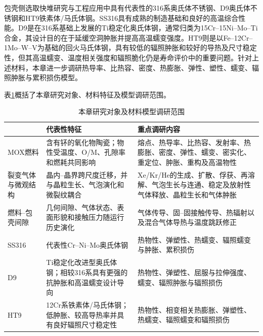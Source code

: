 包壳侧选取快堆研究与工程应用中具有代表性的316系奥氏体不锈钢、D9奥氏体不锈钢和HT9铁素体/马氏体钢。SS316具有成熟的制造基础和良好的高温综合性能。D9是在316系基础上发展的Ti稳定化奥氏体钢，通常归类为15Cr--15Ni--Mo--Ti合金，其设计目的在于延缓空洞肿胀并提高高温蠕变强度。HT9则是以Fe--12Cr--1Mo--W--V为基础的回火马氏体钢，具有较低的辐照肿胀和较好的导热及尺寸稳定性，但其高温蠕变、温度相关强度和辐照脆化仍是寿命评价中的重要问题\cite{garnerComparisonSwellingIrradiation2000,lathaThermalCreepProperties2008,leibowitzThermalConductivityThermal1988,chenIRRADIATIONEFFECTSHT92013}。针对上述材料，本章进一步调研热导率、比热容、密度、热膨胀、弹性、塑性、蠕变、辐照肿胀与累积损伤模型。

表\ref{tab:chapter2_model_scope}概括了本章研究对象、材料特征及模型调研范围。

\begin{table}[htbp]
	\centering
	\caption{本章研究对象及材料模型调研范围}
	\label{tab:chapter2_model_scope}
	\begin{tabularx}{\textwidth}{
			>{\raggedright\arraybackslash}p{2.35cm}
			>{\raggedright\arraybackslash}p{3.15cm}
			>{\raggedright\arraybackslash}X}
		\toprule
		{\centering 研究对象\par} & {\centering 代表性特征\par} & {\centering 重点调研内容\par} \\
		\midrule
		MOX燃料
		& 含有钚的氧化物陶瓷；物性受温度、O/M、孔隙率和燃耗共同影响
		& 熔点、热导率、比热容、发射率、热膨胀、密度、弹性、蠕变、密实化、重定位、肿胀、重构及高温物性 \\
		\addlinespace[0.5ex]
		裂变气体与微观结构
		& 晶内--晶界跨尺度迁移，并与晶粒生长、气泡演化和微裂纹耦合
		& Xe/Kr/He的生成、扩散、俘获、再溶解、气泡生长与连通、稳定及放射性气体释放、晶粒生长和气体肿胀 \\
		燃料--包壳间隙
		& 几何间隙、气体状态、表面形貌和接触压力随运行历史演化
		& 气体传导、固--固接触传导、热辐射以及混合气体导热与温度跳跃修正 \\
		SS316
		& 代表性Cr--Ni--Mo奥氏体钢
		& 热物性、弹塑性、热蠕变、辐照蠕变与肿胀、累积损伤 \\
		D9
		& Ti稳定化改进型奥氏体钢；相较316系具有更强的抗肿胀和高温蠕变设计导向
		& 热物性、弹塑性、屈服与拉伸强度、蠕变、辐照肿胀与辐照损伤 \\
		HT9
		& 12Cr系铁素体/马氏体钢；低肿胀、较高导热率并具有良好辐照尺寸稳定性
		& 热物性、相变相关热膨胀、弹塑性、热蠕变、辐照蠕变和辐照损伤 \\
		\bottomrule
	\end{tabularx}
\end{table}

